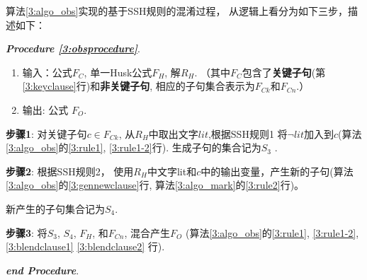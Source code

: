 算法\ref{3:algo_obs}实现的基于SSH规则的混淆过程，
从逻辑上看分为如下三步，描述如下：

\textit{\textbf{Procedure \ref{3:obsprocedure}}}.
\begin{enumerate}
\item[]\label{3:obsprocedure}
输入：公式$F_C$, 单一Husk公式$F_H$, 解$R_H$.
（其中$F_C$包含了\textbf{关键子句}(第\ref{3:keyclause}行)和\textbf{非关键子句},
相应的子句集合表示为\textbf{$F_{Ck}$}和\textbf{$F_{Cn}$}.）
\item[] 输出: 公式 $F_O$.
\end{enumerate}

\textbf{步骤1}:
对关键子句$c\in F_{Ck}$,
从$R_H$中取出文字$lit$,根据SSH规则1
将$\neg lit$加入到$c$(算法\ref{3:algo_obs}的\ref{3:rule1}, \ref{3:rule1-2}行).
生成子句的集合记为$S_3$ .

\textbf{步骤2}:
根据SSH规则2，
使用$R_H$中文字lit和$c$中的输出变量，产生新的子句(算法 \ref{3:algo_obs}的\ref{3:gennewclause}行,  算法\ref{3:algo_mark}的\ref{3:rule2}行)。

新产生的子句集合记为$S_4$.

\textbf{步骤3}:
将$S_3$, $S_4$, $F_H$, 和$F_{Cn}$, 混合产生$F_O$ (算法\ref{3:algo_obs}的\ref{3:rule1}, \ref{3:rule1-2}, \ref{3:blendclause1} \ref{3:blendclause2} 行).

\textit{\textbf{end Procedure}}.


